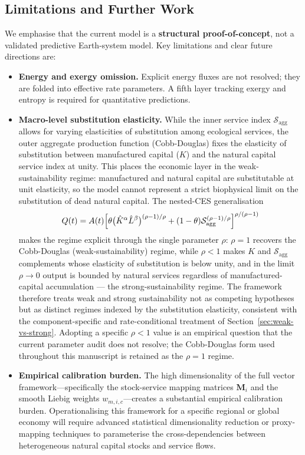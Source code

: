 \documentclass[twocolumn,10pt]{article}
\begin{document}
\subsection{Limitations and Further Work}
\label{sec:limitations-further-work}
We emphasise that the current model is a \textbf{structural proof-of-concept}, not a validated predictive Earth-system model. Key limitations and clear future directions are:
\begin{itemize}
\item \textbf{Energy and exergy omission.} Explicit energy fluxes are not resolved; they are folded into effective rate parameters. A fifth layer tracking exergy and entropy is required for quantitative predictions.
\item \textbf{Macro-level substitution elasticity.} While the inner service index \(\mathcal{S}_{\text{agg}}\) allows for varying elasticities of substitution among ecological services, the outer aggregate production function (Cobb-Douglas) fixes the elasticity of substitution between manufactured capital (\(K\)) and the natural capital service index at unity. This places the economic layer in the weak-sustainability regime: manufactured and natural capital are substitutable at unit elasticity, so the model cannot represent a strict biophysical limit on the substitution of dead natural capital. The nested-CES generalisation \[ Q(t) = A(t)\Bigl[\theta\bigl(\hat K^\alpha \hat L^\beta\bigr)^{(\rho-1)/\rho} + (1-\theta)\mathcal{S}_{\text{agg}}^{(\rho-1)/\rho}\Bigr]^{\rho/(\rho-1)} \] makes the regime explicit through the single parameter \(\rho\): \(\rho=1\) recovers the Cobb-Douglas (weak-sustainability) regime, while \(\rho<1\) makes \(K\) and \(\mathcal{S}_{\text{agg}}\) complements whose elasticity of substitution is below unity, and in the limit \(\rho\to0\) output is bounded by natural services regardless of manufactured-capital accumulation --- the strong-sustainability regime. The framework therefore treats weak and strong sustainability not as competing hypotheses but as distinct regimes indexed by the substitution elasticity, consistent with the component-specific and rate-conditional treatment of Section~\ref{sec:weak-vs-strong}. Adopting a specific \(\rho<1\) value is an empirical question that the current parameter audit does not resolve; the Cobb-Douglas form used throughout this manuscript is retained as the \(\rho=1\) regime.
\item \textbf{Empirical calibration burden.} The high dimensionality of the full vector framework---specifically the stock-service mapping matrices \(\mathbf{M}_i\) and the smooth Liebig weights \(w_{m,i,c}\)---creates a substantial empirical calibration burden. Operationalising this framework for a specific regional or global economy will require advanced statistical dimensionality reduction or proxy-mapping techniques to parameterise the cross-dependencies between heterogeneous natural capital stocks and service flows.

\end{itemize}
\end{document}
